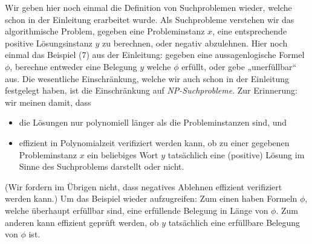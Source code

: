 Wir geben hier noch einmal die Definition von Suchproblemen wieder, welche schon in der Einleitung erarbeitet wurde.
Als Suchprobleme verstehen wir das algorithmische Problem, gegeben eine Probleminstanz $x$, eine entsprechende positive Lösungsinstanz $y$ zu berechnen, oder negativ abzulehnen.  Hier noch einmal das Beispiel (7) aus der Einleitung: gegeben eine aussagenlogische Formel $\phi$, berechne entweder eine Belegung $y$ welche $\phi$ erfüllt, oder gebe „unerfüllbar“ aus.
Die wesentliche Einschränkung, welche wir auch schon in der Einleitung festgelegt haben, ist die Einschränkung auf \emph{NP-Suchprobleme}. Zur Erinnerung: wir meinen damit, dass
\begin{itemize}
    \item die Lösungen nur polynomiell länger als die Probleminstanzen sind, und
    \item effizient in Polynomialzeit verifiziert werden kann, ob zu einer gegebenen Probleminstanz $x$ ein beliebiges Wort $y$ tatsächlich eine (positive) Lösung im Sinne des Suchproblems darstellt oder nicht.
\end{itemize}
(Wir fordern im Übrigen nicht, dass negatives Ablehnen effizient verifiziert werden kann.)
Um das Beispiel wieder aufzugreifen: Zum einen haben Formeln $\phi$, welche überhaupt erfüllbar sind, eine erfüllende Belegung in Länge von $\phi$. Zum anderen kann effizient geprüft werden, ob $y$ tatsächlich eine erfüllbare Belegung von $\phi$ ist.



